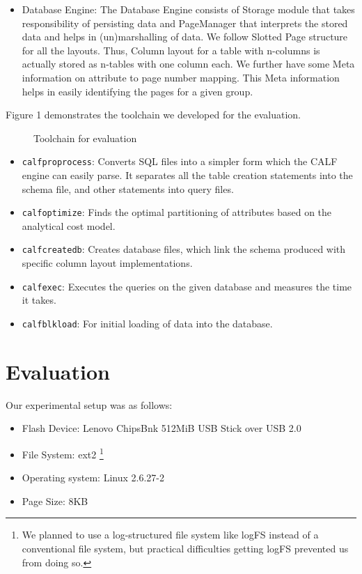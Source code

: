 \documentclass[twocolumn,11pt]{article}
\begin{document}
\begin{itemize}
	\item Database Engine:
	The Database Engine consists of Storage module that takes responsibility of persisting 
	data and PageManager that interprets the stored data and helps in (un)marshalling of 
	data. We follow Slotted Page structure for all the layouts. Thus, Column layout for a 
	table with n-columns is actually stored as n-tables with one column each. We further 
	have some Meta information on attribute to page number mapping. This Meta information 
	helps in easily identifying the pages for a given group.

\end{itemize}

Figure 1 demonstrates the toolchain we developed for the evaluation.

\begin{figure}[htp]
	\begin{centering}
		\label{fig:case0}
		\caption{Toolchain for evaluation}
	\end{centering}
\end{figure}

\begin{itemize}
	\item {\tt calfproprocess}: Converts SQL files into a simpler form which the 
	CALF engine can easily parse. It separates all the table creation statements
	into the schema file, and other statements into query files.
	\item {\tt calfoptimize}: Finds the optimal partitioning of attributes based
	on the analytical cost model.
	\item {\tt calfcreatedb}: Creates database files, which link the schema produced
	with specific column layout implementations.
	\item {\tt calfexec}: Executes the queries on the given database and measures
	the time it takes.
	\item {\tt calfblkload}: For initial loading of data into the database.
\end{itemize}
 
\section{Evaluation}

Our experimental setup was as follows:
\begin{itemize}
	\item Flash Device: Lenovo ChipsBnk 512MiB USB Stick over USB 2.0
	\item File  System: ext2
		\footnote{We planned to use a log-structured file system like logFS instead
		of a conventional file system, but practical difficulties getting logFS
		prevented us from doing so.}
	\item Operating system: Linux 2.6.27-2
	\item Page Size: 8KB
\end{itemize}
\end{document}
